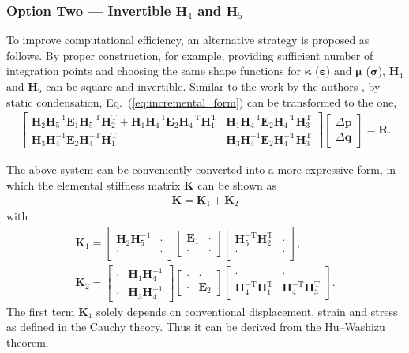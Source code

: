 \documentclass[3p,sort&compress,11pt,fleqn,review]{elsarticle}
\newcommand*{\eqsref}[1]{Eq.~(\ref{#1})}
\newcommand*{\mb}[1]{\boldsymbol{#1}}
\newcommand*{\mT}{\mathrm{T}}
\begin{document}
\subsubsection{Option Two --- Invertible $\mb{H}_4$ and $\mb{H}_5$}
\alert{To improve computational efficiency, an alternative strategy is proposed as follows.} By proper construction, \alert{for example, providing sufficient number of integration points and choosing the same shape functions for $\mb{\kappa}$ ($\mb{\varepsilon}$) and $\mb{\mu}$ ($\mb{\sigma}$),} $\mb{H}_4$ and $\mb{H}_5$ can be square and invertible. Similar to the work by the authors \citep{Chang2019}, by static condensation, \eqsref{eq:incremental_form} can be transformed to the one,
\begin{gather}
\begin{bmatrix}
\mb{H}_2\mb{H}_5^{-1}\mb{E}_1\mb{H}_5^{-\mT}\mb{H}_2^\mT+\mb{H}_1\mb{H}_4^{-1}\mb{E}_2\mb{H}_4^{-\mT}\mb{H}_1^\mT&\mb{H}_1\mb{H}_4^{-1}\mb{E}_2\mb{H}_4^{-\mT}\mb{H}_3^\mT\\
\mb{H}_3\mb{H}_4^{-1}\mb{E}_2\mb{H}_4^{-\mT}\mb{H}_1^\mT&\mb{H}_3\mb{H}_4^{-1}\mb{E}_2\mb{H}_4^{-\mT}\mb{H}_3^\mT
\end{bmatrix}
\begin{bmatrix}
\Delta\mb{p}\\\Delta\mb{q}
\end{bmatrix}=\mb{R}.
\end{gather}

The above system can be conveniently converted into a more expressive form, in which the elemental stiffness matrix $\mb{K}$ can be shown as
\begin{gather}\label{eq:stiffness}
\mb{K}=\mb{K}_1+\mb{K}_2
\end{gather}
with
\begin{gather}
\mb{K}_1=\begin{bmatrix}
\mb{H}_2\mb{H}_5^{-1}&\cdot\\\cdot&\cdot
\end{bmatrix}\begin{bmatrix}
\mb{E}_1&\cdot\\\cdot&\cdot
\end{bmatrix}\begin{bmatrix}
\mb{H}_5^{-\mT}\mb{H}_2^\mT&\cdot\\\cdot&\cdot
\end{bmatrix},\\
\mb{K}_2=\begin{bmatrix}
\cdot&\mb{H}_1\mb{H}_4^{-1}\\\cdot&\mb{H}_3\mb{H}_4^{-1}
\end{bmatrix}\begin{bmatrix}
\cdot&\cdot\\\cdot&\mb{E}_2
\end{bmatrix}\begin{bmatrix}
\cdot&\cdot\\\mb{H}_4^{-\mT}\mb{H}_1^\mT&\mb{H}_4^{-\mT}\mb{H}_3^\mT
\end{bmatrix}.
\end{gather}
The first term $\mb{K}_1$ solely depends on conventional displacement, strain and stress as defined in the Cauchy theory. Thus it can be derived from the Hu--Washizu theorem.
\end{document}
